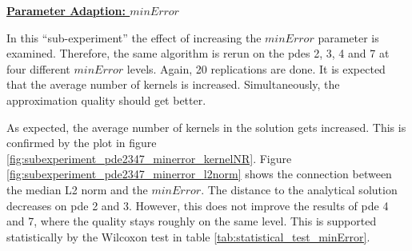 \documentclass[./\jobname.tex]{subfiles}
\begin{document}
\textbf{\underline{Parameter Adaption: $minError$}} 

In this ``sub-experiment'' the effect of increasing the $minError$ parameter is examined. Therefore, the same algorithm is rerun on the \gls{pde}s 2, 3, 4 and 7 at four different $minError$ levels. Again, 20 replications are done. It is expected that the average number of kernels is increased. Simultaneously, the approximation quality should get better. 

As expected, the average number of kernels in the solution gets increased. This is confirmed by the plot in figure \ref{fig:subexperiment_pde2347_minerror_kernelNR}. Figure \ref{fig:subexperiment_pde2347_minerror_l2norm} shows the connection between the median L2 norm and the $minError$. The distance to the analytical solution decreases on \gls{pde} 2 and 3. However, this does not improve the results of \gls{pde} 4 and 7, where the quality stays roughly on the same level. This is supported statistically by the Wilcoxon test in table \ref{tab:statistical_test_minError}.
\end{document}
